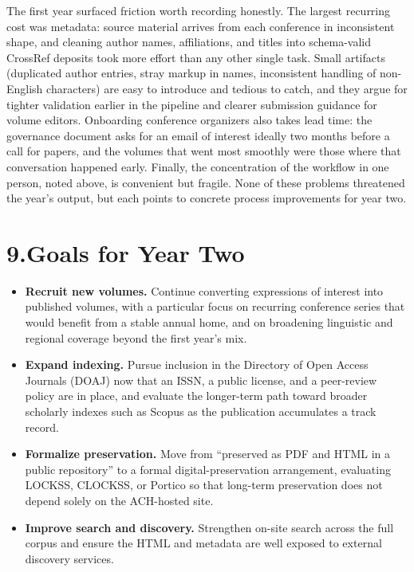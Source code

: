\documentclass[11pt]{article}
\begin{document}
The first year surfaced friction worth recording honestly. The largest recurring cost was metadata: source material arrives from each conference in inconsistent shape, and cleaning author names, affiliations, and titles into schema-valid CrossRef deposits took more effort than any other single task. Small artifacts (duplicated author entries, stray markup in names, inconsistent handling of non-English characters) are easy to introduce and tedious to catch, and they argue for tighter validation earlier in the pipeline and clearer submission guidance for volume editors. Onboarding conference organizers also takes lead time: the governance document asks for an email of interest ideally two months before a call for papers, and the volumes that went most smoothly were those where that conversation happened early. Finally, the concentration of the workflow in one person, noted above, is convenient but fragile. None of these problems threatened the year's output, but each points to concrete process improvements for year two.

\section*{9.\quad Goals for Year Two}

\begin{itemize}[leftmargin=1.5em]
\item \textbf{Recruit new volumes.} Continue converting expressions of interest into published volumes, with a particular focus on recurring conference series that would benefit from a stable annual home, and on broadening linguistic and regional coverage beyond the first year's mix.
\item \textbf{Expand indexing.} Pursue inclusion in the Directory of Open Access Journals (DOAJ) now that an ISSN, a public license, and a peer-review policy are in place, and evaluate the longer-term path toward broader scholarly indexes such as Scopus as the publication accumulates a track record.
\item \textbf{Formalize preservation.} Move from ``preserved as PDF and HTML in a public repository'' to a formal digital-preservation arrangement, evaluating LOCKSS, CLOCKSS, or Portico so that long-term preservation does not depend solely on the ACH-hosted site.
\item \textbf{Improve search and discovery.} Strengthen on-site search across the full corpus and ensure the HTML and metadata are well exposed to external discovery services.
\end{itemize}
\end{document}
